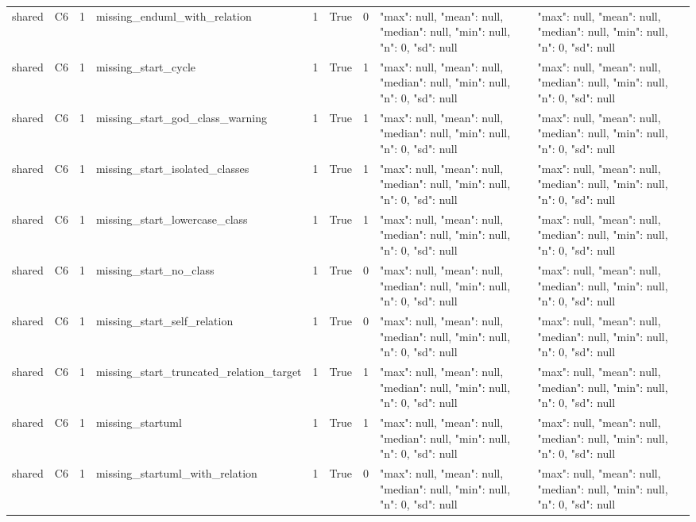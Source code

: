 \begin{tabular}{lllllllll}
shared & C6 & 1 & missing\_enduml\_with\_relation & 1 & True & 0 & {"max": null, "mean": null, "median": null, "min": null, "n": 0, "sd": null} & {"max": null, "mean": null, "median": null, "min": null, "n": 0, "sd": null} \\
shared & C6 & 1 & missing\_start\_cycle & 1 & True & 1 & {"max": null, "mean": null, "median": null, "min": null, "n": 0, "sd": null} & {"max": null, "mean": null, "median": null, "min": null, "n": 0, "sd": null} \\
shared & C6 & 1 & missing\_start\_god\_class\_warning & 1 & True & 1 & {"max": null, "mean": null, "median": null, "min": null, "n": 0, "sd": null} & {"max": null, "mean": null, "median": null, "min": null, "n": 0, "sd": null} \\
shared & C6 & 1 & missing\_start\_isolated\_classes & 1 & True & 1 & {"max": null, "mean": null, "median": null, "min": null, "n": 0, "sd": null} & {"max": null, "mean": null, "median": null, "min": null, "n": 0, "sd": null} \\
shared & C6 & 1 & missing\_start\_lowercase\_class & 1 & True & 1 & {"max": null, "mean": null, "median": null, "min": null, "n": 0, "sd": null} & {"max": null, "mean": null, "median": null, "min": null, "n": 0, "sd": null} \\
shared & C6 & 1 & missing\_start\_no\_class & 1 & True & 0 & {"max": null, "mean": null, "median": null, "min": null, "n": 0, "sd": null} & {"max": null, "mean": null, "median": null, "min": null, "n": 0, "sd": null} \\
shared & C6 & 1 & missing\_start\_self\_relation & 1 & True & 0 & {"max": null, "mean": null, "median": null, "min": null, "n": 0, "sd": null} & {"max": null, "mean": null, "median": null, "min": null, "n": 0, "sd": null} \\
shared & C6 & 1 & missing\_start\_truncated\_relation\_target & 1 & True & 1 & {"max": null, "mean": null, "median": null, "min": null, "n": 0, "sd": null} & {"max": null, "mean": null, "median": null, "min": null, "n": 0, "sd": null} \\
shared & C6 & 1 & missing\_startuml & 1 & True & 1 & {"max": null, "mean": null, "median": null, "min": null, "n": 0, "sd": null} & {"max": null, "mean": null, "median": null, "min": null, "n": 0, "sd": null} \\
shared & C6 & 1 & missing\_startuml\_with\_relation & 1 & True & 0 & {"max": null, "mean": null, "median": null, "min": null, "n": 0, "sd": null} & {"max": null, "mean": null, "median": null, "min": null, "n": 0, "sd": null} \\

\end{tabular}
